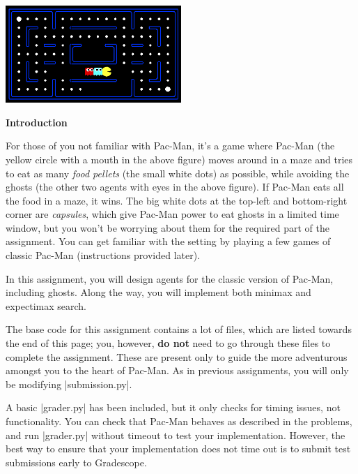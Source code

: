 \begin{center}
\includegraphics[width=0.5\textwidth]{pacman_multi_agent.png}
\end{center}

{\bf Introduction}

For those of you not familiar with Pac-Man, it's a game where Pac-Man (the
yellow circle with a mouth in the above figure) moves around in a maze and tries
to eat as many {\em food pellets} (the small white dots) as possible, while
avoiding the ghosts (the other two agents with eyes in the above figure). If
Pac-Man eats all the food in a maze, it wins. The big white dots at the top-left
and bottom-right corner are {\em capsules}, which give Pac-Man power to eat
ghosts in a limited time window, but you won't be worrying about them for the
required part of the assignment. You can get familiar with the setting by
playing a few games of classic Pac-Man (instructions provided later).

In this assignment, you will design agents for the classic version of Pac-Man,
including ghosts. Along the way, you will implement both minimax and expectimax
search.

The base code for this assignment contains a lot of files, which are listed
towards the end of this page; you, however, {\bf do not} need to go through
these files to complete the assignment. These are present only to guide the more
adventurous amongst you to the heart of Pac-Man. As in previous assignments, you
will only be modifying |submission.py|.

A basic |grader.py| has been included, but it only checks for
timing issues, not functionality. You can check that Pac-Man behaves as
described in the problems, and run |grader.py| without timeout to test your
implementation. However, the best way to ensure that your implementation does
not time out is to submit test submissions early to Gradescope.
\clearpage


\clearpage


\clearpage
